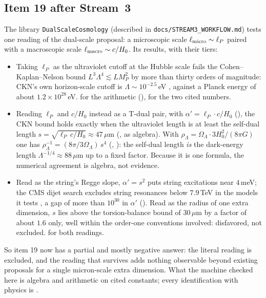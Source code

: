 \subsection{Item 19 after Stream~3}\label{sec:open:stream3}
The library \texttt{DualScaleCosmology} (described in \texttt{docs/STREAM3\_WORKFLOW.md}) tests one
reading of the dual-scale proposal: a microscopic scale $\ell_{\rm micro}\sim\ell_P$ paired with a
macroscopic scale $\ell_{\rm macro}\sim c/H_0$. Its results, with their tiers:
{\sloppy\begin{itemize}
  \item Taking $\ell_P$ as the ultraviolet cutoff at the Hubble scale fails the Cohen--Kaplan--Nelson
    bound $L^3\Lambda^4\lesssim L M_P^2$  by more
    than thirty orders of magnitude: CKN's own horizon-scale cutoff is $\Lambda\sim10^{-2.5}$\,eV
    , against a Planck energy of about
    $1.2\times10^{28}$\,eV. \TA{} for the arithmetic
    (\allowbreak{}\allowbreak{}\allowbreak{}), \TL{} for the
    two cited numbers.
  \item Reading $\ell_P$ and $c/H_0$ instead as a T-dual pair, with $\alpha'=\ell_P\cdot c/H_0$
    (\TC{}), the CKN bound holds exactly when the ultraviolet length is at least the self-dual length
    $s=\sqrt{\ell_P\,c/H_0}\approx47\,\mu$m
    (\allowbreak{}\allowbreak{}\allowbreak{}, \TA{} as algebra).
    With $\rho_\Lambda=\Omega_\Lambda\cdot3H_0^2/(8\pi G)$ one has
    $\rho_\Lambda^{-1}=(8\pi/3\Omega_\Lambda)\,s^4$
    (\allowbreak{}\allowbreak{}, \TA): the self-dual length
    \emph{is} the dark-energy length $\Lambda^{-1/4}\approx88\,\mu$m up to a fixed factor. Because it
    is one formula, the numerical agreement is algebra, not evidence.
  \item Read as the string's Regge slope, $\alpha'=s^2$ puts string excitations near $4$\,meV; the CMS
    dijet search excludes string resonances below $7.9$\,TeV in the models it tests
    , a gap of more than $10^{30}$ in $\alpha'$
    (\allowbreak{}\allowbreak{}\allowbreak{}). Read as the
    radius of one extra dimension, $s$ lies above the torsion-balance bound of $30\,\mu$m
     by a factor of about $1.6$ only, well within the
    order-one conventions involved: disfavored, not excluded. \TC{} for both readings.
\end{itemize}}
So item 19 now has a partial and mostly negative answer: the literal reading is excluded, and the
reading that survives adds nothing observable beyond existing proposals for a single micron-scale
extra dimension. What the machine checked here is algebra and arithmetic on cited constants; every
identification with physics is \TC.


